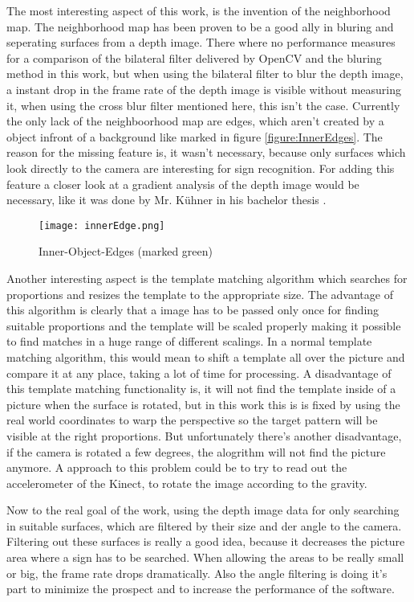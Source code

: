 The most interesting aspect of this work, is the invention of the neighborhood map. The neighborhood map has been proven
to be a good ally in bluring and seperating surfaces from a depth image. There where no performance
measures for a comparison of the bilateral filter delivered by OpenCV and the bluring method in this work,
but when using the bilateral filter to blur the depth image, a instant drop in the frame rate of the depth image is visible
without measuring it, when using the cross blur filter mentioned here, this isn't the case. Currently the only lack
of the neighboorhood map are edges, which aren't created by a object infront of a background like marked in figure \vref{figure:InnerEdges}.
The reason for the missing feature is, it wasn't necessary, because only surfaces which look directly to the camera 
are interesting for sign recognition. For adding this feature a closer look at a gradient analysis of the depth image 
would be necessary, like it was done by Mr. Kühner in his bachelor thesis \cite{max:recog}.

\begin{figure}[H]
\begin{center}
  \texttt{[image: innerEdge.png]}
  \caption{Inner-Object-Edges (marked green)}
  \label{figure:InnerEdges}
\end{center}
\end{figure}

Another interesting aspect is the template matching algorithm which searches for proportions and resizes the
template to the appropriate size. The advantage of this algorithm is clearly that a image has to be passed
only once for finding suitable proportions and the template will be scaled properly making it possible
to find matches in a huge range of different scalings. In a normal template matching algorithm,
this would mean to shift a template all over the picture and compare it at any place, taking a lot
of time for processing. A disadvantage of this template matching functionality is, it will not
find the template inside of a picture when the surface is rotated, but in this work this is
is fixed by using the real world coordinates to warp the perspective so the target pattern
will be visible at the right proportions. But unfortunately there's another disadvantage,
if the camera is rotated a few degrees, the alogrithm will not find the picture anymore.
A approach to this problem could be to try to read out the accelerometer of the Kinect,
to rotate the image according to the gravity.

Now to the real goal of the work, using the depth image data for only searching in suitable surfaces,
which are filtered by their size and der angle to the camera. Filtering out these surfaces
is really a good idea, because it decreases the picture area where a sign has to be searched.
When allowing the areas to be really small or big, the frame rate drops dramatically. Also
the angle filtering is doing it's part to minimize the prospect and to increase the performance
of the software.